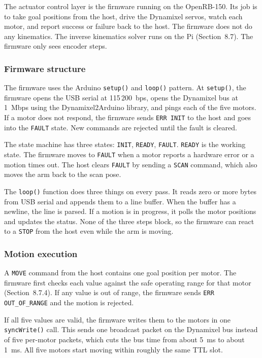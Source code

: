 
The actuator control layer is the firmware running on the OpenRB-150.
Its job is to take goal positions from the host, drive the Dynamixel
servos, watch each motor, and report success or failure back to the
host. The firmware does not do any kinematics. The inverse kinematics
solver runs on the Pi (Section~8.7). The firmware
only sees encoder steps.

\subsubsection*{Firmware structure}

The firmware uses the Arduino \texttt{setup()} and \texttt{loop()}
pattern.
At \texttt{setup()}, the firmware opens the USB serial at 115\,200~bps,
opens the Dynamixel bus at 1~Mbps using the Dynamixel2Arduino library,
and pings each of the five motors. If a motor does not respond, the
firmware sends \texttt{ERR INIT} to the host and goes into the
\texttt{FAULT} state. New commands are rejected until the fault is
cleared.

The state machine has three states: \texttt{INIT}, \texttt{READY},
\texttt{FAULT}. \texttt{READY} is the working state. The firmware
moves to \texttt{FAULT} when a motor reports a hardware error or a
motion times out. The host clears \texttt{FAULT} by sending a
\texttt{SCAN} command, which also moves the arm back to the scan pose.

The \texttt{loop()} function does three things on every pass. It
reads zero or more bytes from USB serial and appends them to a line
buffer. When the buffer has a newline, the line is parsed. If a
motion is in progress, it polls the motor positions and updates the
status. None of the three steps block, so the firmware can react to a
\texttt{STOP} from the host even while the arm is moving.

\subsubsection*{Motion execution}

A \texttt{MOVE} command from the host contains one goal position per
motor. The firmware first checks each value against the safe operating
range for that motor (Section~8.7.4). If any value
is out of range, the firmware sends \texttt{ERR OUT\_OF\_RANGE} and
the motion is rejected.

If all five values are valid, the firmware writes them to the motors
in one \texttt{syncWrite()} call. This sends one broadcast packet on
the Dynamixel bus instead of five per-motor packets, which cuts the
bus time from about 5~ms to about 1~ms. All five motors start moving
within roughly the same TTL slot.

